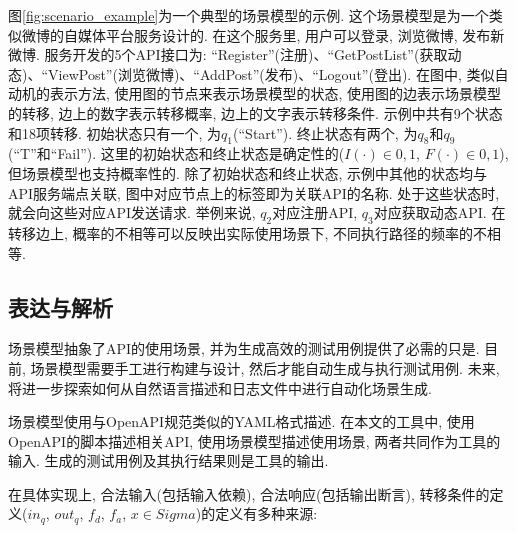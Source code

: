             图\ref{fig:scenario_example}为一个典型的场景模型的示例. 这个场景模型是为一个类似微博的自媒体平台服务设计的. 在这个服务里, 用户可以登录, 浏览微博, 发布新微博. 服务开发的5个API接口为: “Register”(注册)、“GetPostList”(获取动态)、“ViewPost”(浏览微博)、“AddPost”(发布)、“Logout”(登出). 在图中, 类似自动机的表示方法, 使用图的节点来表示场景模型的状态, 使用图的边表示场景模型的转移, 边上的数字表示转移概率, 边上的文字表示转移条件. 示例中共有9个状态和18项转移. 初始状态只有一个, 为$q_1$(“Start”). 终止状态有两个, 为$q_8$和$q_9$(“T”和“Fail”). 这里的初始状态和终止状态是确定性的($I(\cdot) \in {0,1}$, $F(\cdot) \in {0,1}$), 但场景模型也支持概率性的. 除了初始状态和终止状态, 示例中其他的状态均与API服务端点关联, 图中对应节点上的标签即为关联API的名称. 处于这些状态时, 就会向这些对应API发送请求. 举例来说, $q_2$对应注册API, $q_3$对应获取动态API. 在转移边上, 概率的不相等可以反映出实际使用场景下, 不同执行路径的频率的不相等.
        
        \subsection{表达与解析}
            场景模型抽象了API的使用场景, 并为生成高效的测试用例提供了必需的只是. 目前, 场景模型需要手工进行构建与设计, 然后才能自动生成与执行测试用例. 未来, 将进一步探索如何从自然语言描述和日志文件中进行自动化场景生成.
            
            场景模型使用与OpenAPI规范类似的YAML格式描述. 在本文的工具中, 使用OpenAPI的脚本描述相关API, 使用场景模型描述使用场景, 两者共同作为工具的输入. 生成的测试用例及其执行结果则是工具的输出.
            
            在具体实现上, 合法输入(包括输入依赖), 合法响应(包括输出断言), 转移条件的定义($in_q$, $out_q$, $f_d$, $f_a$, $x \in Sigma$)的定义有多种来源:
            
